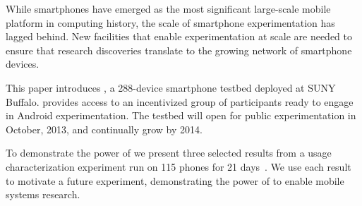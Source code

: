 While smartphones have emerged as the most significant large-scale mobile
platform in computing history, the scale of smartphone experimentation has
lagged behind. New facilities that enable experimentation at scale are needed
to ensure that research discoveries translate to the growing network of
smartphone devices.

This paper introduces \PhoneLab{}, a 288-device smartphone testbed deployed
at SUNY Buffalo. \PhoneLab{} provides access to an incentivized group of
participants ready to engage in Android experimentation. The testbed will
open for public experimentation in October, 2013, and continually grow by 2014.

To demonstrate the power of \PhoneLab{} we present three selected results
from a usage characterization experiment run on 115 phones for 21
days~. We use each result to
motivate a future \PhoneLab{} experiment, demonstrating the power of
\PhoneLab{} to enable mobile systems research.
